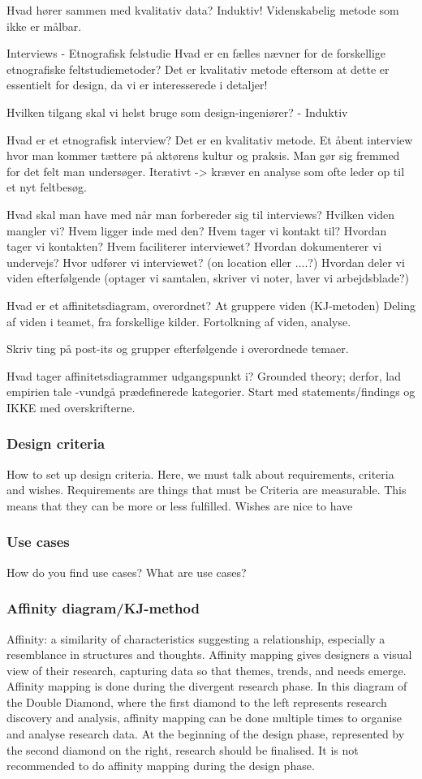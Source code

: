 Hvad hører sammen med kvalitativ data?
Induktiv! Videnskabelig metode som ikke er målbar.

Interviews - Etnografisk felstudie
Hvad er en fælles nævner for de forskellige etnografiske feltstudiemetoder?
Det er kvalitativ metode eftersom at dette er essentielt for design, da vi er interesserede i detaljer!

Hvilken tilgang skal vi helst bruge som design-ingeniører? - Induktiv

Hvad er et etnografisk interview?
Det er en kvalitativ metode.
Et åbent interview hvor man kommer tættere på aktørens kultur og praksis.
Man gør sig fremmed for det felt man undersøger.
Iterativt -> kræver en analyse som ofte leder op til et nyt feltbesøg.

Hvad skal man have med når man forbereder sig til interviews?
Hvilken viden mangler vi?
Hvem ligger inde med den?
Hvem tager vi kontakt til? Hvordan tager vi kontakten?
Hvem faciliterer interviewet?
Hvordan dokumenterer vi undervejs?
Hvor udfører vi interviewet? (on location eller ....?)
Hvordan deler vi viden efterfølgende (optager vi samtalen, skriver vi noter, laver vi arbejdsblade?)

Hvad er et affinitetsdiagram, overordnet?
At gruppere viden (KJ-metoden)
Deling af viden i teamet, fra forskellige kilder.
Fortolkning af viden, analyse.

Skriv ting på post-its og grupper efterfølgende i overordnede temaer.

Hvad tager affinitetsdiagrammer udgangspunkt i?
Grounded theory; derfor, lad empirien tale -vundgå prædefinerede kategorier.
Start med statements/findings og IKKE med overskrifterne.

\subsubsection{Design criteria}
How to set up design criteria.
Here, we must talk about requirements, criteria and wishes.
Requirements are things that must be
Criteria are measurable. This means that they can be more or less fulfilled.
Wishes are nice to have

\subsubsection{Use cases}
How do you find use cases? What are use cases?

\subsubsection{Affinity diagram/KJ-method}
Affinity: a similarity of characteristics suggesting a relationship, especially a resemblance in structures and thoughts.
Affinity mapping gives designers a visual view of their research, capturing data so that themes, trends, and needs emerge.
Affinity mapping is done during the divergent research phase. In this diagram of the Double Diamond, where the first diamond to the left represents research discovery and analysis, affinity mapping can be done multiple times to organise and analyse research data. At the beginning of the design phase, represented by the second diamond on the right, research should be finalised. It is not recommended to do affinity mapping during the design phase.